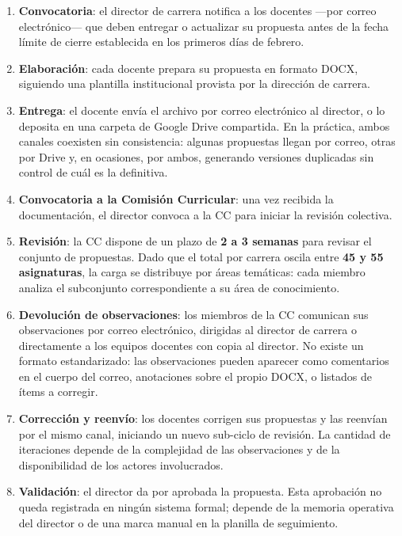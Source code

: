 \begin{enumerate}
    \item \textbf{Convocatoria}: el director de carrera notifica a los docentes ---por correo electrónico--- que deben entregar o actualizar su propuesta antes de la fecha límite de cierre establecida en los primeros días de febrero.

    \item \textbf{Elaboración}: cada docente prepara su propuesta en formato DOCX, siguiendo una plantilla institucional provista por la dirección de carrera.

    \item \textbf{Entrega}: el docente envía el archivo por correo electrónico al director, o lo deposita en una carpeta de Google Drive compartida. En la práctica, ambos canales coexisten sin consistencia: algunas propuestas llegan por correo, otras por Drive y, en ocasiones, por ambos, generando versiones duplicadas sin control de cuál es la definitiva.

    \item \textbf{Convocatoria a la Comisión Curricular}: una vez recibida la documentación, el director convoca a la CC para iniciar la revisión colectiva.

    \item \textbf{Revisión}: la CC dispone de un plazo de \textbf{2 a 3 semanas} para revisar el conjunto de propuestas. Dado que el total por carrera oscila entre \textbf{45 y 55 asignaturas}, la carga se distribuye por áreas temáticas: cada miembro analiza el subconjunto correspondiente a su área de conocimiento.

    \item \textbf{Devolución de observaciones}: los miembros de la CC comunican sus observaciones por correo electrónico, dirigidas al director de carrera o directamente a los equipos docentes con copia al director. No existe un formato estandarizado: las observaciones pueden aparecer como comentarios en el cuerpo del correo, anotaciones sobre el propio DOCX, o listados de ítems a corregir.

    \item \textbf{Corrección y reenvío}: los docentes corrigen sus propuestas y las reenvían por el mismo canal, iniciando un nuevo sub-ciclo de revisión. La cantidad de iteraciones depende de la complejidad de las observaciones y de la disponibilidad de los actores involucrados.

    \item \textbf{Validación}: el director da por aprobada la propuesta. Esta aprobación no queda registrada en ningún sistema formal; depende de la memoria operativa del director o de una marca manual en la planilla de seguimiento.
\end{enumerate}

